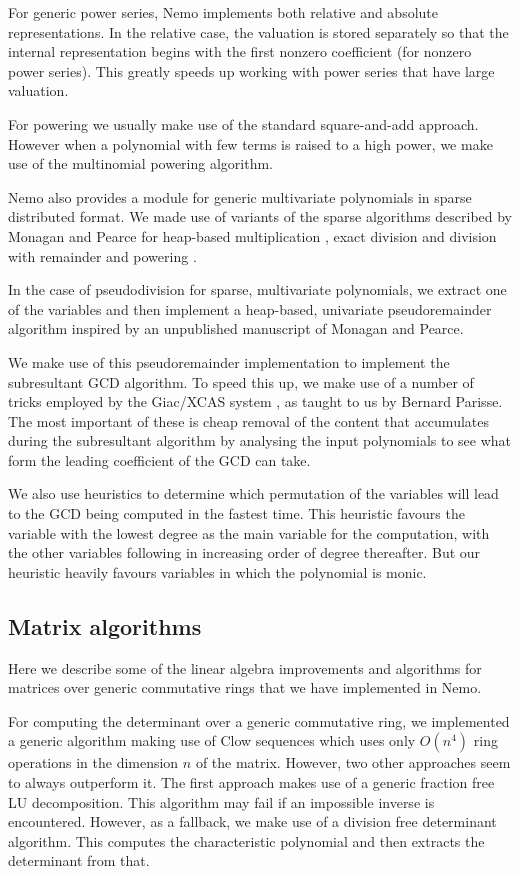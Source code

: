 \documentclass{sig-alternate-05-2015}
\begin{document}
For generic power series, Nemo implements both relative and absolute
representations. In the relative case, the valuation is stored separately so that
the internal representation begins with the first nonzero coefficient (for nonzero
power series). This greatly speeds up working with power series that have large
valuation.

For powering we usually make use of the standard square-and-add approach. However
when a polynomial with few terms is raised to a high power, we make use of the
multinomial powering algorithm.

Nemo also provides a module for generic multivariate polynomials in sparse distributed
format. We made use of variants of the sparse algorithms described by Monagan and
Pearce for heap-based multiplication \cite{heapmul}, exact division and division with
remainder \cite{heapdiv} and powering \cite{heappow}.

In the case of pseudodivision for sparse, multivariate polynomials, we extract one
of the variables and then implement a heap-based, univariate pseudoremainder
algorithm inspired by an unpublished manuscript of Monagan and Pearce.

We make use of this pseudoremainder implementation to implement the subresultant
GCD algorithm. To speed this up, we make use of a number of tricks employed by the
Giac/XCAS system \cite{giac}, as taught to us by Bernard Parisse. The most important
of these is cheap removal of the content that accumulates during the subresultant
algorithm by analysing the input polynomials to see what form the leading coefficient
of the GCD can take.

We also use heuristics to determine which permutation of the variables will lead to
the GCD being computed in the fastest time. This heuristic favours the variable with
the lowest degree as the main variable for the computation, with the other variables 
following in increasing order of degree thereafter. But our heuristic heavily favours
variables in which the polynomial is monic.

\subsection{Matrix algorithms}

Here we describe some of the linear algebra improvements and algorithms for matrices
over generic commutative rings that we have implemented in Nemo.

For computing the determinant over a generic commutative ring, we implemented a generic
algorithm making use of Clow sequences \cite{clow} which uses only $O(n^4)$ ring operations
in the dimension $n$ of the matrix. However, two other approaches seem to always outperform
it. The first approach makes use of a generic fraction free LU decomposition. This algorithm
may fail if an impossible inverse is encountered. However, as a fallback, we make use of a
division free determinant algorithm. This computes the characteristic polynomial and then
extracts the determinant from that.
\end{document}
